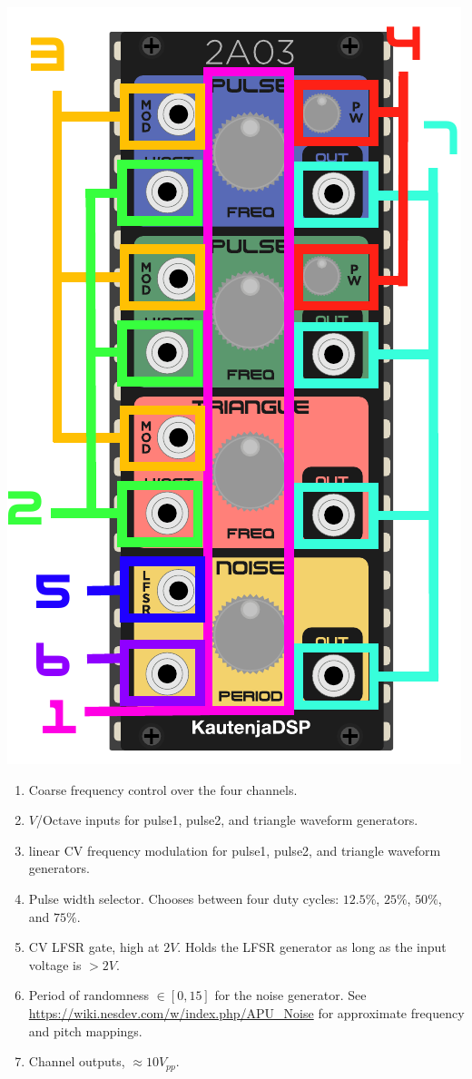 \documentclass[12pt,a4paper]{article}
\begin{document}
\begin{center}
\includegraphics{2A03-Manual}
\end{center}

\begin{enumerate}
  \item Coarse frequency control over the four channels.
  \item $V$/Octave inputs for pulse1, pulse2, and triangle waveform generators.
  \item linear CV frequency modulation for pulse1, pulse2, and triangle waveform generators.
  \item Pulse width selector. Chooses between four duty cycles: $12.5\%$, $25\%$, $50\%$, and $75\%$.
  \item CV LFSR gate, high at $2V$. Holds the LFSR generator as long as the input voltage is $>2V$.
  \item Period of randomness $\in [0, 15]$ for the noise generator. See \url{https://wiki.nesdev.com/w/index.php/APU_Noise} for approximate frequency and pitch mappings.
  \item Channel outputs, ${\approx}10V_{pp}$.
\end{enumerate}


\clearpage
\renewcommand\refname{References \& Acknowledgments}
\nocite{*}


\end{document}
